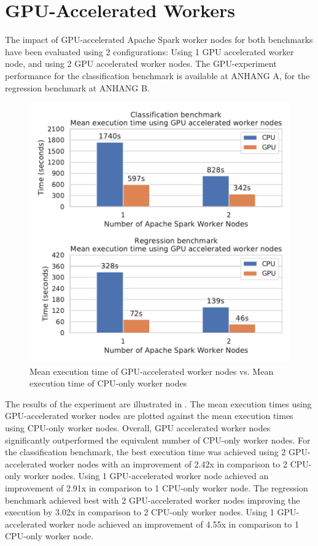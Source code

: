 \section{GPU-Accelerated Workers}
The impact of GPU-accelerated Apache Spark worker nodes for both benchmarks have been evaluated using 2 configurations: Using 1 GPU accelerated worker node, and using 2 GPU accelerated worker nodes.
%
The GPU-experiment performance for the classification benchmark is available at ANHANG A, for the regression benchmark at ANHANG B.


\begin{figure}[h]
\centering
\includegraphics[scale=0.9]{images/07_evaluation/overall_cpu_vs_gpu}
\caption{Mean execution time of GPU-accelerated worker nodes vs. Mean execution time of CPU-only worker nodes}
\label{fig:07_gpu_results}
\end{figure}
The results of the experiment are illustrated in .
The mean execution times using GPU-accelerated worker nodes are plotted against the mean execution times using CPU-only worker nodes.
Overall, GPU accelerated worker nodes significantly outperformed the equivalent number of CPU-only worker nodes.
For the classification benchmark, the best execution time was achieved using 2 GPU-accelerated worker nodes with an improvement of 2.42x in comparison to 2 CPU-only worker nodes. Using 1 GPU-accelerated worker node achieved an improvement of 2.91x in comparison to 1 CPU-only worker node.
The regression benchmark achieved best with 2 GPU-accelerated worker nodes improving the execution by 3.02x in comparison to 2 CPU-only worker nodes. Using 1 GPU-accelerated worker node achieved an improvement of 4.55x in comparison to 1 CPU-only worker node.

